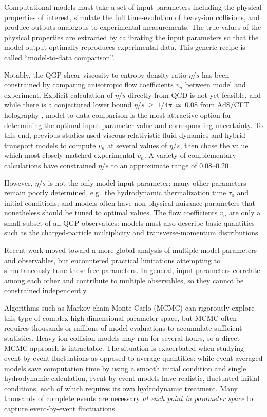 \documentclass[aps,prc,reprint,superscriptaddress,amsmath]{revtex4-1}
\begin{document}
Computational models must take a set of input parameters including the physical properties of interest, simulate the full time-evolution of heavy-ion collisions, and produce outputs analogous to experimental measurements.
The true values of the physical properties are extracted by calibrating the input parameters so that the model output optimally reproduces experimental data.
This generic recipe is called ``model-to-data comparison''.

Notably, the QGP shear viscosity to entropy density ratio $\eta/s$ has been constrained by comparing anisotropic flow coefficients $v_n$ between model and experiment.
Explicit calculation of $\eta/s$ directly from QCD is not yet feasible, and while there is a conjectured lower bound $\eta/s~\geq~1/4\pi~\simeq~0.08$ from AdS/CFT holography \cite{Kovtun:2004de}, model-to-data comparison is the most attractive option for determining the optimal input parameter value and corresponding uncertainty.
To this end, previous studies used viscous relativistic fluid dynamics and hybrid transport models to compute $v_n$ at several values of $\eta/s$, then chose the value which most closely matched experimental $v_n$.
A variety of complementary calculations have constrained $\eta/s$ to an approximate range of 0.08--0.20 \cite{Luzum:2008cw,Song:2010mg,Schenke:2010rr,Luzum:2012wu}.

However, $\eta/s$ is not the only model input parameter:
many other parameters remain poorly determined, e.g.~the hydrodynamic thermalization time $\tau_0$ and initial conditions; and models often have non-physical nuisance parameters that nonetheless should be tuned to optimal values.
The flow coefficients $v_n$ are only a small subset of all QGP observables:
models must also describe basic quantities such as the charged-particle multiplicity and transverse-momentum distributions.

Recent work \cite{Soltz:2012rk} moved toward a more global analysis of multiple model parameters and observables, but encountered practical limitations attempting to simultaneously tune these free parameters.
In general, input parameters correlate among each other and contribute to multiple observables, so they cannot be constrained independently.

Algorithms such as Markov chain Monte Carlo (MCMC) can rigorously explore this type of complex high-dimensional parameter space, but MCMC often requires thousands or millions of model evaluations to accumulate sufficient statistics.
Heavy-ion collision models may run for several hours, so a direct MCMC approach is intractable.
The situation is exacerbated when studying event-by-event fluctuations as opposed to average quantities:
while event-averaged models save computation time by using a smooth initial condition and single hydrodynamic calculation, event-by-event models have realistic, fluctuated initial conditions, each of which requires its own hydrodynamic treatment.
Many thousands of complete events are necessary \emph{at each point in parameter space} to capture event-by-event fluctuations.
\end{document}
